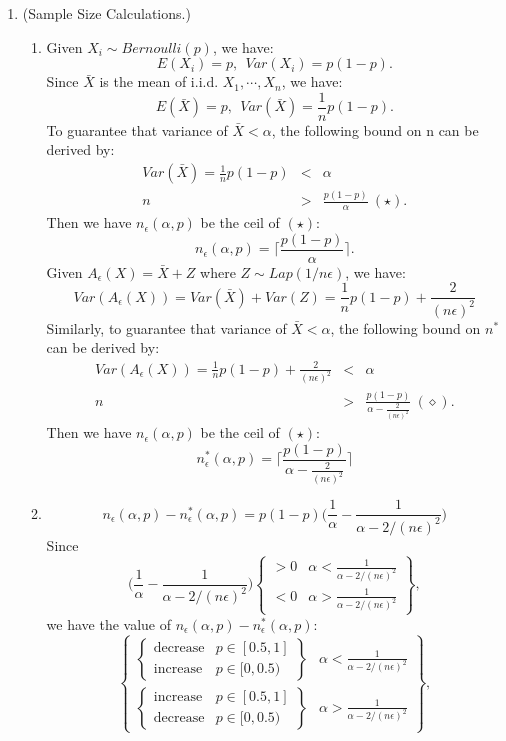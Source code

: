 \documentclass[11pt]{article}
\begin{document}
\begin{enumerate}
	\item (Sample Size Calculations.)
\begin{enumerate}
	\item
	Given $X_i \sim Bernoulli(p)$, we have:
	\[
	E(X_i) = p, ~~ Var(X_i) = p(1 - p).
	\]
	Since $\bar{X}$ is the mean of i.i.d. $X_1, \cdots, X_n$, we have:
	\[
	E(\bar{X}) = p, ~~ Var(\bar{X}) = \frac{1}{n}p(1 - p).
	\]
	To guarantee that variance of $\bar{X} < \alpha$, the following bound on n can be derived by:
	\[
	\begin{array}{ccc}
	Var(\bar{X}) = \frac{1}{n}p(1 - p)& < & \alpha\\
	n & > & \frac{p(1 - p)}{\alpha} ~ (\star).
	\end{array}
	\]
	Then we have $n_{\epsilon}(\alpha, p)$ be the ceil of $(\star)$:
	\[
	n_{\epsilon}(\alpha, p) = \Bigg\lceil \frac{p(1-p)}{\alpha} \Bigg\rceil.
	\]
	Given $A_{\epsilon}(X) = \bar{X} + Z$ where $Z \sim Lap(1/n\epsilon)$, we have:
	\[
	Var(A_{\epsilon}(X)) = Var(\bar{X}) + Var(Z) = \frac{1}{n}p(1 - p) + \frac{2}{(n\epsilon)^2}
	\]
	Similarly, to guarantee that variance of $\bar{X} < \alpha$, the following bound on $n^*$ can be derived by:
	\[
	\begin{array}{ccc}
	Var(A_{\epsilon}(X)) = 
	\frac{1}{n}p(1 - p) + \frac{2}{(n\epsilon)^2} & < & \alpha\\
	n & > & \frac{p(1 - p)}{\alpha - \frac{2}{(n\epsilon)^2}} ~ (\diamond).
	\end{array}
	\]
	Then we have $n_{\epsilon}(\alpha, p)$ be the ceil of $(\star)$:
	\[
	n^*_{\epsilon}(\alpha, p) 
	= \Bigg\lceil \frac{p(1-p)}{\alpha - \frac{2}{(n\epsilon)^2}} \Bigg\rceil
	\]
	\item 
	\[
	n_{\epsilon}(\alpha, p) - n^*_{\epsilon}(\alpha, p)
	= p(1-p)\big( \frac{1}{\alpha} - \frac{1}{\alpha - 2/(n\epsilon)^2} \big)
	\]
	Since 
	\[
	\big( \frac{1}{\alpha} - \frac{1}{\alpha - 2/(n\epsilon)^2} \big)
	\left \{ 
	\begin{array}{lr}
	> 0 &  \alpha < \frac{1}{\alpha - 2/(n\epsilon)^2}\\
	< 0 & \alpha > \frac{1}{\alpha - 2/(n\epsilon)^2}
	\end{array}
	\right \},
	\] 
	we have the value of $n_{\epsilon}(\alpha, p) - n^*_{\epsilon}(\alpha, p)$:
	\[
	\left \{ 
	\begin{array}{lr}
	\left \{
	\begin{array}{ll}
	\text{decrease} & p \in [0.5, 1]\\
	\text{increase} & p \in [0, 0.5)
	\end{array}
	\right \}
	&  \alpha < \frac{1}{\alpha - 2/(n\epsilon)^2}\\
	\left \{
	\begin{array}{ll}
	\text{increase} & p \in [0.5, 1]\\
	\text{decrease} & p \in [0, 0.5)
	\end{array}
	\right \}
	& \alpha > \frac{1}{\alpha - 2/(n\epsilon)^2}
	\end{array}
	\right \},
	\] 
	

\end{enumerate}
\end{enumerate}
\end{document}
